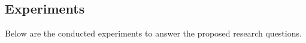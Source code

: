 \subsection{Experiments}

Below are the conducted experiments to answer the proposed research questions.
% 

% 







